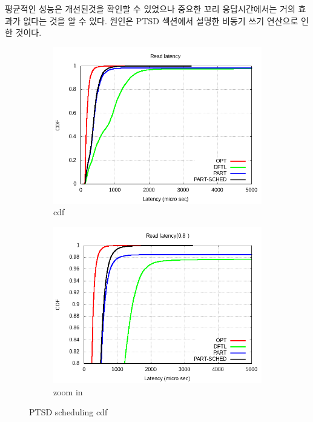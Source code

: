 \documentclass[conference]{IEEEtran}
\begin{document}
평균적인 성능은 개선된것을 확인할 수 있었으나 중요한 꼬리 응답시간에서는 거의 효과가 없다는 
것을 알 수 있다. 원인은 PTSD 섹션에서 설명한 비동기 쓰기 연산으로 인한 것이다.\par

\begin{figure}[hbt]
	\centering
	\begin{subfigure}[b]{0.3\textwidth}	
		\includegraphics[width=\linewidth]{image/EVAL/cdf2.png}
		\caption{cdf} \label{fig:cdf2}
	\end{subfigure}
	\begin{subfigure}[b]{0.3\textwidth}	
		\includegraphics[width=\linewidth]{image/EVAL/cdf2_zoom.png}
		\caption{zoom in} \label{fig:cdf2_zoom}
	\end{subfigure}
	\caption{PTSD scheduling cdf}
\end{figure}
\end{document}
